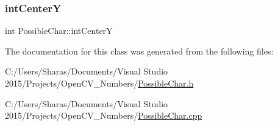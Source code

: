 \subsubsection{\texorpdfstring{int\+CenterY}{intCenterY}}
{\footnotesize\ttfamily int Possible\+Char\+::int\+CenterY}



The documentation for this class was generated from the following files\+:\begin{DoxyCompactItemize}
\item 
C\+:/\+Users/\+Sharas/\+Documents/\+Visual Studio 2015/\+Projects/\+Open\+C\+V\+\_\+\+Numbers/\hyperlink{_possible_char_8h}{Possible\+Char.\+h}\item 
C\+:/\+Users/\+Sharas/\+Documents/\+Visual Studio 2015/\+Projects/\+Open\+C\+V\+\_\+\+Numbers/\hyperlink{_possible_char_8cpp}{Possible\+Char.\+cpp}\end{DoxyCompactItemize}
